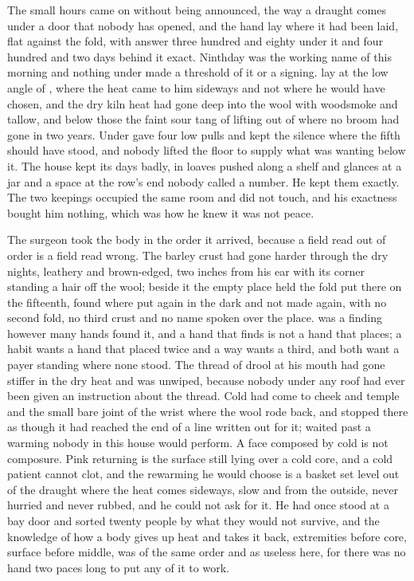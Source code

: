 
The small hours came on without being announced, the way a draught comes under a door that nobody has opened, and the hand lay where it had been laid, flat against the fold, with answer three hundred and eighty under it and four hundred and two days behind it exact. Ninthday was the working name of this morning and nothing under  made a threshold of it or a signing.  lay at the low angle of , where the heat came to him sideways and not where he would have chosen, and the dry kiln heat had gone deep into the wool with woodsmoke and tallow, and below those the faint sour tang of  lifting out of  where no broom had gone in two years. Under   gave four low pulls and kept the silence where the fifth should have stood, and nobody lifted the floor to supply what was wanting below it. The house kept its days badly, in loaves pushed along a shelf and glances at a jar and a space at the row's end nobody called a number. He kept them exactly. The two keepings occupied the same room and did not touch, and his exactness bought him nothing, which was how he knew it was not peace.

The surgeon took the body in the order it arrived, because a field read out of order is a field read wrong. The barley crust had gone harder through the dry nights, leathery and brown-edged, two inches from his ear with its corner standing a hair off the wool; beside it the empty place held the fold put there on the fifteenth, found where put again in the dark and not made again, with no second fold, no third crust and no name spoken over the place.  was a finding however many hands found it, and a hand that finds is not a hand that places; a habit wants a hand that placed twice and a way wants a third, and both want a payer standing where none stood. The thread of drool at his mouth had gone stiffer in the dry heat and was unwiped, because nobody under any roof had ever been given an instruction about the thread. Cold had come to cheek and temple and the small bare joint of the wrist where the wool rode back, and stopped there as though it had reached the end of a line written out for it;  waited past a warming nobody in this house would perform. A face composed by cold is not composure. Pink returning is the surface still lying over a cold core, and a cold patient cannot clot, and the rewarming he would choose is a basket set level out of the draught where the heat comes sideways, slow and from the outside, never hurried and never rubbed, and he could not ask for it. He had once stood at a bay door and sorted twenty people by what they would not survive, and the knowledge of how a body gives up heat and takes it back, extremities before core, surface before middle, was of the same order and as useless here, for there was no hand two paces long to put any of it to work.

